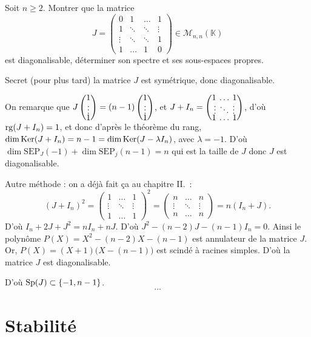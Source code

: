 \begin{exo}
	Soit $n \ge 2$. Montrer que la matrice \[
		J = \begin{pmatrix}
			0&1&\ldots&1\\
			1&\ddots&\ddots&\vdots\\
			\vdots&\ddots&\ddots&1\\
			1&\ldots&1&0
		\end{pmatrix} \in \mathscr{M}_{n,n}(\mathds{K})
	\] est diagonalisable, déterminer son spectre et ses sous-espaces propres.

	{\color{gray} Secret (pour plus tard) la matrice $J$\/ est symétrique, donc diagonalisable.}

	On remarque que $J \left( \substack{\displaystyle1\\\displaystyle\vdots\\\displaystyle1} \right) = (n-1)\left( \substack{\displaystyle1\\\displaystyle\vdots\\\displaystyle1} \right)$, et $J + I_n = \left( \substack{\displaystyle1\:\ldots\:1\\\displaystyle\vdots\:\ddots\:\vdots\\\displaystyle1\:\ldots\:1} \right)$, d'où $\operatorname{rg}(J + I_n) = 1$, et donc d'après le théorème du rang, $\dim \operatorname{Ker}(J + I_n) = n-1 = \dim \operatorname{Ker}(J - \lambda I_n)$, avec $\lambda = -1$.
	D'où $\dim \mathrm{SEP}_J(-1) + \dim \mathrm{SEP}_j(n-1) = n$\/ qui est la taille de $J$\/ donc $J$\/ est diagonalisable.

	Autre méthode : on a déjà fait ça au chapitre II.\ : \[
		(J + I_n)^2 = \begin{pmatrix}
			1&\ldots&1\\
			\vdots&\ddots&\vdots\\
			1&\ldots&1
		\end{pmatrix}^2 = \begin{pmatrix}
			n&\ldots&n\\
			\vdots&\ddots&\vdots\\
			n&\ldots&n
		\end{pmatrix}  = n (I_n + J)
	.\] D'où $I_n + 2J + J^2 = n I_n + nJ$. D'où $J^2 - (n-2)J - (n-1) I_n = 0$.
	Ainsi le polynôme $P(X) = X^2 - (n-2) X - (n-1)$\/ est annulateur de la matrice $J$.
	Or, $P(X) = (X + 1)\big(X - (n-1)\big)$\/ est scindé à racines simples. D'où la matrice $J$\/ est diagonalisable.

	D'où $\operatorname{Sp}(J) \subset \{-1, n-1\}$.
	\[
		\ldots
	\]
\end{exo}

\section{Stabilité}

